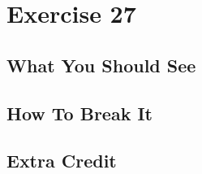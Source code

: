 \chapter{Exercise 27}


\section{What You Should See}


\section{How To Break It}


\section{Extra Credit}




